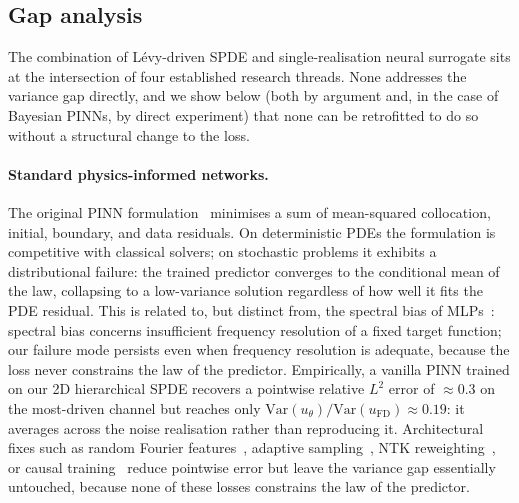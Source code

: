 \documentclass[review,12pt]{elsarticle}
\begin{document}
\subsection{Gap analysis}
\label{subsec:gap-analysis}

The combination of L\'evy-driven SPDE and single-realisation neural
surrogate sits at the intersection of four established research
threads. None addresses the variance gap directly, and we show below
(both by argument and, in the case of Bayesian PINNs, by direct
experiment) that none can be retrofitted to do so without a
structural change to the loss.

\paragraph{Standard physics-informed networks.}
The original PINN formulation~\cite{Raissi2019} minimises a sum of
mean-squared collocation, initial, boundary, and data residuals. On
deterministic PDEs the formulation is competitive with classical
solvers; on stochastic problems it exhibits a distributional failure:
the trained predictor converges to the conditional mean of the law,
collapsing to a low-variance solution regardless of how well it fits
the PDE residual. This is related to, but distinct from, the spectral
bias of MLPs~\cite{Rahaman2019,Tancik2020}: spectral bias concerns
insufficient frequency resolution of a fixed target function; our
failure mode persists even when frequency resolution is adequate,
because the loss never constrains the law of the predictor.
Empirically, a vanilla PINN trained on our 2D hierarchical SPDE
recovers a pointwise relative \(L^2\) error of \(\approx 0.3\) on the
most-driven channel but reaches only
\(\mathrm{Var}(u_\theta)/\mathrm{Var}(u_{\mathrm{FD}})\approx 0.19\):
it averages across the noise realisation rather than reproducing it.
Architectural fixes such as random Fourier
features~\cite{Tancik2020}, adaptive sampling~\cite{Lu2021DeepONet},
NTK reweighting~\cite{Wang2022}, or causal
training~\cite{Wang2024Causal} reduce pointwise error but leave the
variance gap essentially untouched, because none of these losses
constrains the law of the predictor.
\end{document}
